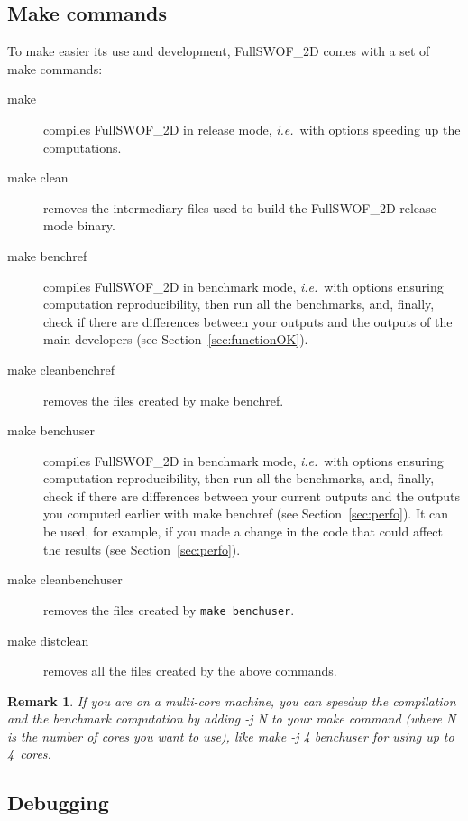 \documentclass[a4paper, 11pt]{article}
\newcommand{\FullSWOF}{FullSWOF\_2D}
\newtheorem{rmk}{Remark}
\begin{document}
\subsection{Make commands}\label{sec:make}
To make easier its use and development, \FullSWOF{} comes with a set of make commands:
\begin{description}
	\item[\textsf{make}] compiles \FullSWOF{} in release mode, 	\textit{i.e.}~with options speeding up the computations.
	\item[\textsf{make clean}] removes the intermediary files used to build the \FullSWOF{} release-mode binary.
	\item[\textsf{make benchref}] compiles \FullSWOF{} in benchmark mode, \textit{i.e.}~with options ensuring computation reproducibility, then run all the benchmarks, and, finally, check if there are differences between your outputs and the outputs of the main developers (see Section~\ref{sec:functionOK}).
	\item[\textsf{make cleanbenchref}] removes the files created by \textsf{make benchref}.
	\item[\textsf{make benchuser}] compiles \FullSWOF{} in benchmark mode, \textit{i.e.}~with options ensuring computation reproducibility, then run all the benchmarks, and, finally, check if there are differences between your current outputs and the outputs you computed earlier with \textsf{make benchref} (see Section~\ref{sec:perfo}).
	      It can be used, for example, if you made a change in the code that could affect the results (see Section~\ref{sec:perfo}).
	\item[\textsf{make cleanbenchuser}] removes the files created by \texttt{make benchuser}.
	\item[\textsf{make distclean}] removes all the files created by the above commands.
\end{description}

\begin{rmk}
	If you are on a multi-core machine, you can speedup the compilation and the benchmark computation by adding \textnormal{\textsf{-j N}} to your make command (where \textnormal{\textsf{N}} is the number of cores you want to use), like \textnormal{\textsf{make -j 4 benchuser}} for using up to 4~cores.
\end{rmk}

\subsection{Debugging}\label{sec:debug}
\end{document}
